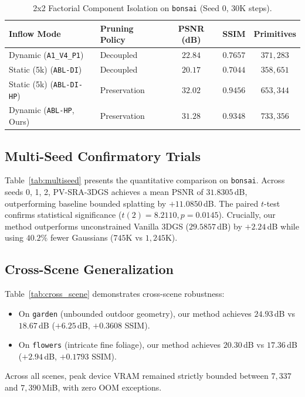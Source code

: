 \documentclass[10pt,twocolumn,letterpaper]{article}
\begin{document}
\begin{table}[t]
\centering
\small
\caption{2x2 Factorial Component Isolation on \texttt{bonsai} (Seed 0, 30K steps).}
\label{tab:factorial_ablation}
\begin{tabular}{llccc}
\toprule
\textbf{Inflow Mode} & \textbf{Pruning Policy} & \textbf{PSNR (dB)} & \textbf{SSIM} & \textbf{Primitives} \\
\midrule
Dynamic (\texttt{A1\_V4\_P1}) & Decoupled & $22.84$ & $0.7657$ & $371{,}283$ \\
Static (5k) (\texttt{ABL-DI}) & Decoupled & $20.17$ & $0.7044$ & $358{,}651$ \\
Static (5k) (\texttt{ABL-DI-HP}) & Preservation & $\mathbf{32.02}$ & $\mathbf{0.9456}$ & $653{,}344$ \\
Dynamic (\texttt{ABL-HP}, Ours) & Preservation & $\mathbf{31.28}$ & $\mathbf{0.9348}$ & $733{,}356$ \\
\bottomrule
\end{tabular}
\end{table}

\subsection{Multi-Seed Confirmatory Trials}

Table~\ref{tab:multiseed} presents the quantitative comparison on \texttt{bonsai}. Across seeds 0, 1, 2, PV-SRA-3DGS achieves a mean PSNR of $31.8305$\,dB, outperforming baseline bounded splatting by $+11.0850$\,dB. The paired $t$-test confirms statistical significance ($t(2) = 8.2110, p = 0.0145$). Crucially, our method outperforms unconstrained Vanilla 3DGS ($29.5857$\,dB) by $+2.24$\,dB while using $40.2\%$ fewer Gaussians ($745\text{K}$ vs $1{,}245\text{K}$).

\subsection{Cross-Scene Generalization}

Table~\ref{tab:cross_scene} demonstrates cross-scene robustness:
\begin{itemize}
    \item On \texttt{garden} (unbounded outdoor geometry), our method achieves $24.93$\,dB vs $18.67$\,dB ($+6.25$\,dB, $+0.3608$ SSIM).
    \item On \texttt{flowers} (intricate fine foliage), our method achieves $20.30$\,dB vs $17.36$\,dB ($+2.94$\,dB, $+0.1793$ SSIM).
\end{itemize}
Across all scenes, peak device VRAM remained strictly bounded between $7{,}337$ and $7{,}390$\,MiB, with zero OOM exceptions.
\end{document}

